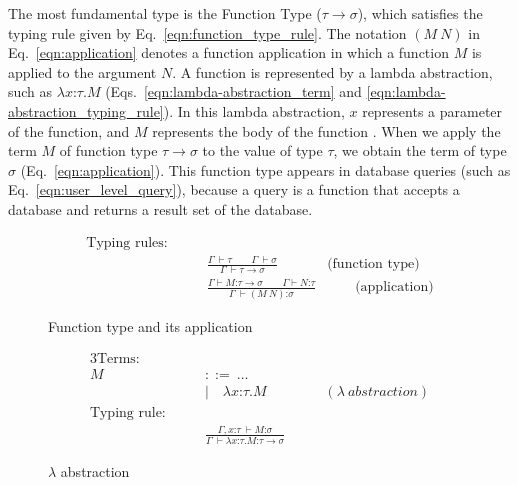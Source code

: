 \documentclass[preprint,3p,onecolumn,times,review]{article}
\begin{document}
{The most fundamental type is the Function Type ($\tau \rightarrow \sigma$), which satisfies the typing rule given by Eq.~\ref{eqn:function_type_rule}.
The notation $(M~N)$ in Eq.~\ref{eqn:application} denotes a function application in which a function $M$ is applied to the argument $N$.
A function is represented by a lambda abstraction, such as $\lambda x\text{:}\tau.M$ (Eqs.~\ref{eqn:lambda-abstraction_term} and \ref{eqn:lambda-abstraction_typing_rule}).
In this lambda abstraction, $x$ represents a parameter of the function, and $M$ represents the body of the function \cite[p.14]{cardelli04:_type_system}.
When we apply the term $M$ of function type $\tau \rightarrow \sigma$ to the value of type $\tau$, we obtain the term of type $\sigma$ (Eq.~\ref{eqn:application}).
This function type appears in database queries (such as Eq.~\ref{eqn:user_level_query}), because a query is a function that accepts a database and returns a result set of the database.

\begin{figure}[!htbp]
  \begin{align}
        \text{Typing rules:} \qquad   \nonumber\\
    & \frac{\Gamma~ \vdash \tau \qquad \Gamma~ \vdash \sigma}
           {\Gamma~ \vdash \tau \rightarrow \sigma}  & \label{eqn:function_type_rule} \text{(function type)}\\[6pt]
    & \frac{\Gamma \vdash M\text{:}\tau \rightarrow \sigma \qquad  \Gamma \vdash N\text{:}\tau}
           {\Gamma ~ \vdash (M~N)\text{:}\sigma} & \qquad \text{(application)} \label{eqn:application}
  \end{align}
\caption{Function type and its application}
\end{figure}

\begin{figure}[!htbp]
\begin{alignat}{3}
  \text{Terms:} \qquad      & \nonumber\\
                               M~ & {::= } ~ \dots \\
                                  & | \quad {\lambda x\text{:}\tau.M} & \qquad (\lambda~abstraction) \label{eqn:lambda-abstraction_term}\\
  \text{Typing rule:} \qquad &       & \nonumber \\
                              & \frac{\Gamma,x\text{:}\tau~ \vdash M\text{:}\sigma }
                                      {\Gamma ~ \vdash \lambda x\text{:}\tau.M\text{:}\tau \rightarrow \sigma} & \label{eqn:lambda-abstraction_typing_rule}
\end{alignat}
\caption{$\lambda$ abstraction}\label{eqn:lambda-abstraction}
\end{figure}

}
\end{document}
